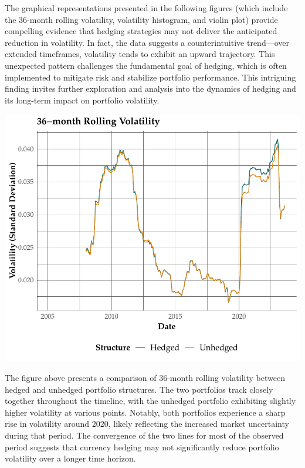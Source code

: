 \documentclass[11pt,preprint, authoryear]{elsarticle}
\numberwithin{equation}{section}
\numberwithin{figure}{section}
\numberwithin{table}{section}
\begin{document}
The graphical representations presented in the following figures (which
include the 36-month rolling volatility, volatility histogram, and
violin plot) provide compelling evidence that hedging strategies may not
deliver the anticipated reduction in volatility. In fact, the data
suggests a counterintuitive trend---over extended timeframes, volatility
tends to exhibit an upward trajectory. This unexpected pattern
challenges the fundamental goal of hedging, which is often implemented
to mitigate risk and stabilize portfolio performance. This intriguing
finding invites further exploration and analysis into the dynamics of
hedging and its long-term impact on portfolio volatility.

\includegraphics{Question-2_files/figure-latex/rolling-ret-1.pdf}

The figure above presents a comparison of 36-month rolling volatility
between hedged and unhedged portfolio structures. The two portfolios
track closely together throughout the timeline, with the unhedged
portfolio exhibiting slightly higher volatility at various points.
Notably, both portfolios experience a sharp rise in volatility around
2020, likely reflecting the increased market uncertainty during that
period. The convergence of the two lines for most of the observed period
suggests that currency hedging may not significantly reduce portfolio
volatility over a longer time horizon.
\end{document}
